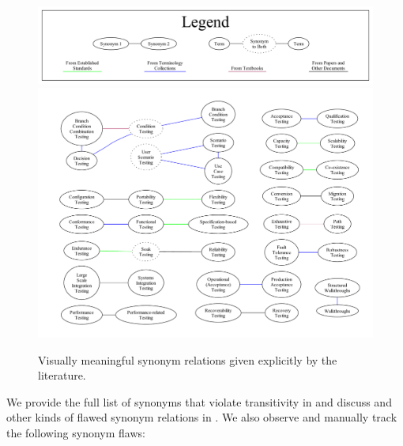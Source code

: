     \begin{figure}[b!]
        \centering
        \includegraphics[width=\textwidth]{assets/graphs/manual/expSynLegend.pdf}
        \includegraphics[width=\textwidth]{assets/graphs/manual/expSynGraph.pdf}
        \caption{Visually meaningful synonym relations given explicitly by the
            literature.}\label{fig:expSynGraph}
    \end{figure}

    We provide the full list of synonyms that violate transitivity in
     and discuss and other kinds of flawed synonym relations in
    . \fi We also observe
and manually track the following synonym flaws:



